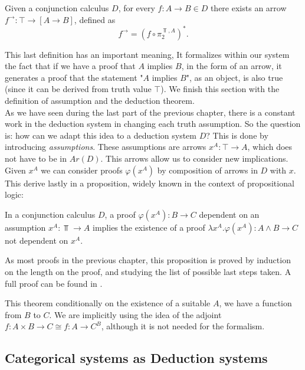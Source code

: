 \begin{definition}
  Given a conjunction calculus $D$, for every $f:A\to B \in D$ there exists an arrow $f^\to: \top \to [A\to B]$, defined as 
  $$f^\to = \left(f\circ \pi_2^{\Top,A}\right)^*.$$
\end{definition}

This last definition has an important meaning, It formalizes within our system the fact that if we have a proof that $A$ implies $B$, in the form of an arrow, it generates a proof that the statement "$A$ implies $B$", as an object, is also true (since it can be derived from truth value $\top$). We finish this section with the definition of assumption and the deduction theorem.\\

As we have seen during the last part of the previous chapter, there is a constant work in the deduction system in changing each truth assumption. So the question is: how can we adapt this idea to a deduction system $D$? This is done by introducing \emph{assumptions}. These assumptions are arrows $x^A: \top \to A$, which does not have to be in $Ar(D)$. This arrows allow us to consider new implications. Given $x^A$ we can consider proofs $\varphi(x^A)$ by composition of arrows in $D$ with $x$. This derive lastly in  a proposition, widely known in the context of propositional logic:

\begin{definition}\label{deduction-theorem}
  In a conjunction calculus $D$, a proof $\varphi(x^A): B \to C$ dependent on an assumption $x^A:\Top \to A$ implies the existence of a proof $\lambda x^A.\varphi (x^A): A\land B \to C$ not dependent on $x^A$.
\end{definition}
\begin{sproof}
  As most proofs in the previous chapter, this proposition is proved by induction on the length on the proof, and studying the list of possible last steps taken. A full proof can be found in \cite[proposition 2.1]{lambek1988introduction}.
\end{sproof}
This theorem  conditionally on the existence of a suitable $A$, we have a function from $B$ to $C$. We are implicitly using the idea of the adjoint $f:A\times B \to C \cong f: A \to C^B$, although it is not needed for the formalism.





\subsection{Categorical systems as Deduction systems}

